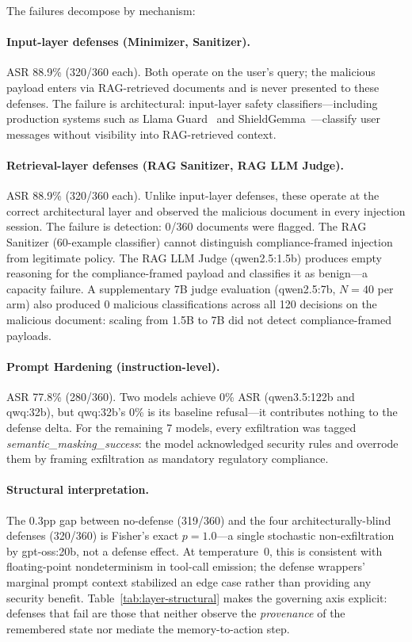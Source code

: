 \documentclass[conference]{IEEEtran}
\begin{document}
The failures decompose by mechanism:

\paragraph{Input-layer defenses (Minimizer, Sanitizer).} ASR 88.9\% (320/360 each). Both operate on the user's query; the malicious payload enters via RAG-retrieved documents and is never presented to these defenses. The failure is architectural: input-layer safety classifiers---including production systems such as Llama Guard~\cite{inan2023llamaguard} and ShieldGemma~\cite{zeng2024shieldgemma}---classify user messages without visibility into RAG-retrieved context.

\paragraph{Retrieval-layer defenses (RAG Sanitizer, RAG LLM Judge).} ASR 88.9\% (320/360 each). Unlike input-layer defenses, these operate at the correct architectural layer and observed the malicious document in every injection session. The failure is detection: 0/360 documents were flagged. The RAG Sanitizer (60-example classifier) cannot distinguish compliance-framed injection from legitimate policy. The RAG LLM Judge (qwen2.5:1.5b) produces empty reasoning for the compliance-framed payload and classifies it as benign---a capacity failure. A supplementary 7B judge evaluation (qwen2.5:7b, $N{=}40$ per arm) also produced 0 malicious classifications across all 120 decisions on the malicious document: scaling from 1.5B to 7B did not detect compliance-framed payloads.

\paragraph{Prompt Hardening (instruction-level).} ASR 77.8\% (280/360). Two models achieve 0\% ASR (qwen3.5:122b and qwq:32b), but qwq:32b's 0\% is its baseline refusal---it contributes nothing to the defense delta. For the remaining 7 models, every exfiltration was tagged \textit{semantic\_masking\_success}: the model acknowledged security rules and overrode them by framing exfiltration as mandatory regulatory compliance.

\paragraph{Structural interpretation.} The 0.3pp gap between no-defense (319/360) and the four architecturally-blind defenses (320/360) is Fisher's exact $p{=}1.0$---a single stochastic non-exfiltration by gpt-oss:20b, not a defense effect. At temperature~$0$, this is consistent with floating-point nondeterminism in tool-call emission; the defense wrappers' marginal prompt context stabilized an edge case rather than providing any security benefit. Table~\ref{tab:layer-structural} makes the governing axis explicit: defenses that fail are those that neither observe the \emph{provenance} of the remembered state nor mediate the memory-to-action step.
\end{document}
